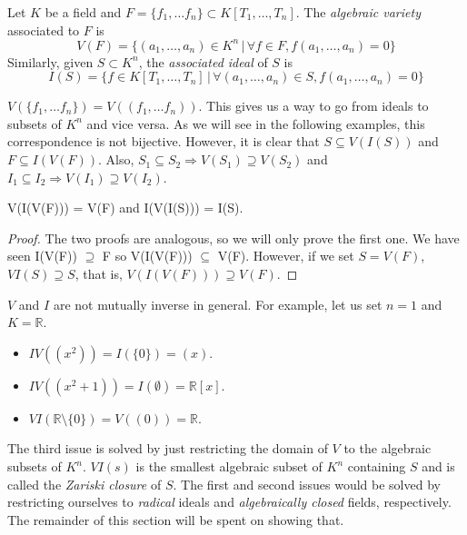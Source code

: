 \begin{defn}
    Let $K$ be a field and $F = \{f_1, \ldots f_n\} \subset K[T_1, \dots, T_n]$.
    The \emph{algebraic variety} associated to $F$ is
    \[ V(F) = \{ (a_1, \ldots, a_n) \in K^n \, | \, \forall f \in F, f(a_1, \ldots, a_n) = 0 \} \]
    Similarly, given $S \subset K^n$, the \emph{associated ideal} of $S$ is
    \[ I(S) = \{ f \in K[T_1, \ldots, T_n] \, | \, \forall (a_1, \ldots, a_n) \in S, f(a_1, \ldots, a_n) = 0 \} \]
\end{defn}

\begin{rk}
    $V(\{f_1, \ldots f_n\}) = V((f_1, \ldots f_n))$.
    This gives us a way to go from ideals to subsets of $K^n$ and vice versa.
    As we will see in the following examples, this correspondence is not bijective.
    However, it is clear that $S \subseteq V(I(S))$ and $F \subseteq I(V(F))$.
    Also, $S_1 \subseteq S_2 \Rightarrow V(S_1) \supseteq V(S_2)$ and
    $I_1 \subseteq I_2 \Rightarrow V(I_1) \supseteq V(I_2)$.
\end{rk}

\begin{prop}
    V(I(V(F))) = V(F) and I(V(I(S))) = I(S).
    \begin{proof}
        The two proofs are analogous, so we will only prove the first one.
        We have seen I(V(F)) $\supseteq$ F so V(I(V(F))) $\subseteq$ V(F).
        However, if we set $S = V(F)$, $VI(S) \supseteq S$, that is, $V(I(V(F))) \supseteq V(F)$.
    \end{proof}
\end{prop}

\begin{example}
    $V$ and $I$ are not mutually inverse in general.
    For example, let us set $n=1$ and $K = \mathbb{R}$.
    \begin{itemize}
        \item $IV((x^2)) = I(\{0\}) = (x)$.
        \item $IV((x^2+1)) = I(\emptyset) = \mathbb{R}[x]$.
        \item $VI(\mathbb{R} \setminus \{0\}) = V((0)) = \mathbb{R}$.
    \end{itemize}
\end{example}

\begin{rk}
    The third issue is solved by just restricting the domain of $V$ to the algebraic subsets of $K^n$.
    $VI(s)$ is the smallest algebraic subset of $K^n$ containing $S$ and is called the \emph{Zariski closure} of $S$.
    The first and second issues would be solved by restricting ourselves to \emph{radical} ideals
    and \emph{algebraically closed} fields, respectively.
    The remainder of this section will be spent on showing that.
\end{rk}

